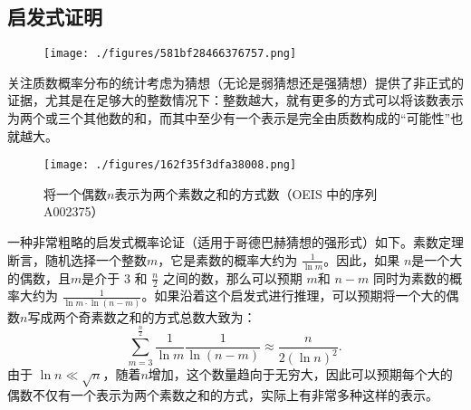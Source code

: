 \subsection{启发式证明}
\begin{figure}[ht]
\centering
\texttt{[image: ./figures/581bf28466376757.png]}
\caption{} \label{fig_GDBHCX_2}
\end{figure}
关注质数概率分布的统计考虑为猜想（无论是弱猜想还是强猜想）提供了非正式的证据，尤其是在足够大的整数情况下：整数越大，就有更多的方式可以将该数表示为两个或三个其他数的和，而其中至少有一个表示是完全由质数构成的“可能性”也就越大。
\begin{figure}[ht]
\centering
\texttt{[image: ./figures/162f35f3dfa38008.png]}
\caption{将一个偶数\(n\)表示为两个素数之和的方式数（OEIS 中的序列 A002375）} \label{fig_GDBHCX_3}
\end{figure}
一种非常粗略的启发式概率论证（适用于哥德巴赫猜想的强形式）如下。素数定理断言，随机选择一个整数\(m\)，它是素数的概率大约为 \( \frac{1}{\ln m} \)。因此，如果 \(n\)是一个大的偶数，且\(m\)是介于 3 和 \( \frac{n}{2} \) 之间的数，那么可以预期 \(m\)和 \( n - m \) 同时为素数的概率大约为 \( \frac{1}{\ln m \cdot \ln(n - m)} \)。如果沿着这个启发式进行推理，可以预期将一个大的偶数\(n\)写成两个奇素数之和的方式总数大致为：
\[
\sum _{m=3}^{\frac {n}{2}}{\frac {1}{\ln m}}{\frac {1}{\ln(n-m)}} \approx \frac{n}{2(\ln n)^{2}}.~
\]
由于 \( \ln n \ll \sqrt{n} \)，随着\(n\)增加，这个数量趋向于无穷大，因此可以预期每个大的偶数不仅有一个表示为两个素数之和的方式，实际上有非常多种这样的表示。